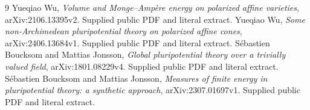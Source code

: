 \documentclass[11pt]{article}
\theoremstyle{remark}
\begin{document}
\begin{thebibliography}{9}
 Yueqiao Wu, \emph{Volume and Monge--Amp\`ere energy on polarized affine varieties}, arXiv:2106.13395v2. Supplied public PDF and literal extract.
 Yueqiao Wu, \emph{Some non-Archimedean pluripotential theory on polarized affine cones}, arXiv:2406.13684v1. Supplied public PDF and literal extract.
 S\'ebastien Boucksom and Mattias Jonsson, \emph{Global pluripotential theory over a trivially valued field}, arXiv:1801.08229v4. Supplied public PDF and literal extract.
 S\'ebastien Boucksom and Mattias Jonsson, \emph{Measures of finite energy in pluripotential theory: a synthetic approach}, arXiv:2307.01697v1. Supplied public PDF and literal extract.
\end{thebibliography}
\end{document}
